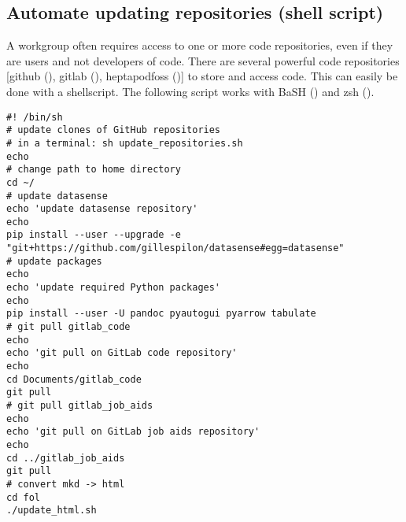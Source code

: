 \documentclass[10pt, letterpaper, twoside]{article}
\begin{document}
\subsection{Automate updating repositories (shell script)}\label{sec:automate_updating_repositories}
A workgroup often requires access to one or more code repositories, even if they are users and not developers of code. There are several powerful code repositories [\Gls{github} (\cite{github}), \Gls{gitlab} (\cite{gitlab}), \gls{heptapodfoss} (\cite{heptapodfoss})] to store and access code. This can easily be done with a \gls{shellscript}. The following script works with BaSH (\cite{bash}) and zsh (\cite{zsh}).
\begin{footnotesize}
\begin{verbatim}
#! /bin/sh
# update clones of GitHub repositories
# in a terminal: sh update_repositories.sh
echo
# change path to home directory
cd ~/
# update datasense
echo 'update datasense repository'
echo
pip install --user --upgrade -e "git+https://github.com/gillespilon/datasense#egg=datasense"
# update packages
echo
echo 'update required Python packages'
echo
pip install --user -U pandoc pyautogui pyarrow tabulate
# git pull gitlab_code
echo
echo 'git pull on GitLab code repository'
echo
cd Documents/gitlab_code
git pull
# git pull gitlab_job_aids
echo
echo 'git pull on GitLab job aids repository'
echo
cd ../gitlab_job_aids
git pull
# convert mkd -> html
cd fol
./update_html.sh
\end{verbatim}
\end{footnotesize}
\end{document}
